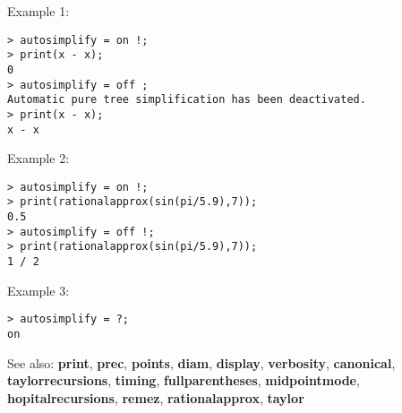 \noindent Example 1: 
\begin{center}\begin{minipage}{15cm}\begin{Verbatim}[frame=single]
> autosimplify = on !;
> print(x - x);
0
> autosimplify = off ;
Automatic pure tree simplification has been deactivated.
> print(x - x);
x - x
\end{Verbatim}
\end{minipage}\end{center}
\noindent Example 2: 
\begin{center}\begin{minipage}{15cm}\begin{Verbatim}[frame=single]
> autosimplify = on !; 
> print(rationalapprox(sin(pi/5.9),7));
0.5
> autosimplify = off !; 
> print(rationalapprox(sin(pi/5.9),7));
1 / 2
\end{Verbatim}
\end{minipage}\end{center}
\noindent Example 3: 
\begin{center}\begin{minipage}{15cm}\begin{Verbatim}[frame=single]
> autosimplify = ?; 
on
\end{Verbatim}
\end{minipage}\end{center}
See also: \textbf{print}, \textbf{prec}, \textbf{points}, \textbf{diam}, \textbf{display}, \textbf{verbosity}, \textbf{canonical}, \textbf{taylorrecursions}, \textbf{timing}, \textbf{fullparentheses}, \textbf{midpointmode}, \textbf{hopitalrecursions}, \textbf{remez}, \textbf{rationalapprox}, \textbf{taylor}
